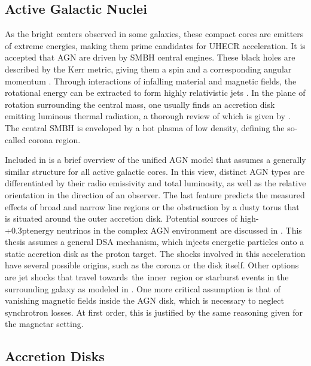 \subsection{Active Galactic Nuclei}
\label{sub:nuclei}

As the bright centers observed in some galaxies, these compact cores are emitters of extreme energies, making them prime
candidates for UHECR acceleration. It is accepted that AGN are driven by SMBH central engines. These black holes are described
by the Kerr metric, giving them a spin and a corresponding angular momentum \cite{Visser_2008}. Through interactions of
infalling material and magnetic fields, the rotational energy can be extracted to form highly relativistic jets \cite{Blandford_2019}.
In the plane of rotation surrounding the central mass, one usually finds an accretion disk emitting luminous thermal radiation,
a thorough review of which is given by \cite{Abramowicz_2013}. The central SMBH is enveloped by a hot plasma of low density,
defining the so-called corona region.

\newpage

Included in \cite{Beckmann_2013} is a brief overview of the unified AGN model that assumes a generally similar structure for all active
galactic cores. In this view, distinct AGN types are differentiated
by their radio emissivity and total luminosity, as well as the relative orientation in the direction of an observer. The
last feature predicts the measured effects of broad and narrow line regions or the obstruction by a dusty torus that is situated
around the outer accretion disk. Potential sources of high-{\kern+0.3pt}energy neutrinos in the complex AGN environment are discussed
in \cite{Murase_2023}. This thesis assumes a general DSA mechanism, which injects energetic particles onto a static accretion disk as
the proton target. The shocks involved in this acceleration have several possible origins, such as the corona or the disk itself. Other
options are jet shocks that travel towards~the~inner~region or starburst events in the surrounding galaxy as modeled in \cite{Eichmann_2022}.
One more critical assumption is that of vanishing magnetic fields inside the AGN disk, which is necessary to neglect synchrotron losses.
At first order, this is justified by the same reasoning given for the magnetar setting.



\subsection{Accretion Disks}
\label{sub:accretion}

